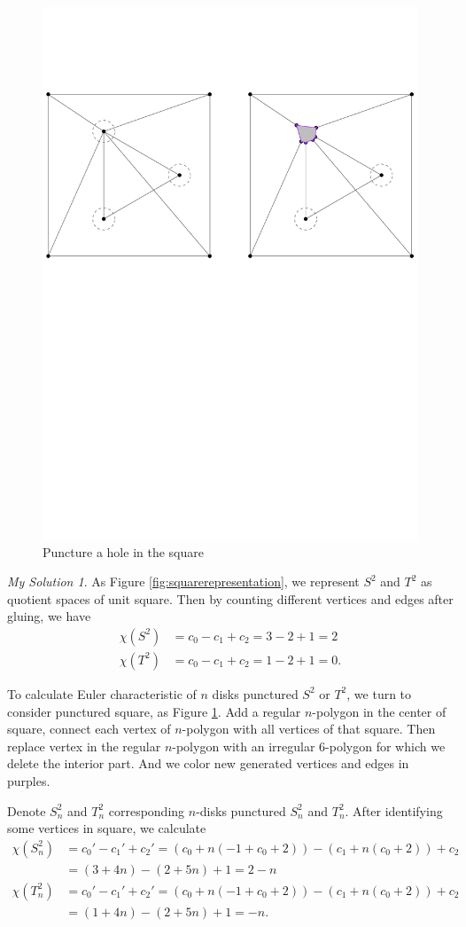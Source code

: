 \documentclass[]{article}
\theoremstyle{remark}
\newtheorem*{sol}{My Solution}
\begin{document}
\begin{figure}
	\centering
	\includegraphics[width=0.7\linewidth]{"delete hole"}
	\caption{Puncture a hole in the square}
	\label{fig:delete-hole}
\end{figure}
\begin{sol}
	As Figure \ref{fig:squarerepresentation}, we represent $ S^2 $ and $ T^2 $ as quotient spaces of unit square. Then by counting different vertices and edges after gluing, we have
	\begin{align*}
		\chi(S^2)&=c_0-c_1+c_2=3-2+1=2\\ \chi(T^2)&=c_0-c_1+c_2=1-2+1=0.
	\end{align*}
	
	To calculate Euler characteristic of $ n $ disks punctured $ S^2 $ or $ T^2 $, we turn to consider punctured square, as Figure \ref{fig:delete-hole}. Add a regular $ n $-polygon in the center of square, connect each vertex of $ n $-polygon with all vertices of that square. Then replace vertex in the regular $ n $-polygon with an irregular $ 6 $-polygon for which we delete the interior part. And we color new generated vertices and edges in purples.
	
	Denote $ S_n^2 $ and $ T_n^2 $ corresponding $ n $-disks punctured $ S_n^2 $ and $ T_n^2 $. After identifying some vertices in square, we calculate
		\begin{align*}
	\chi(S^2_n)&=c_0'-c_1'+c_2'=(c_0+n(-1 + c_0 +2))-(c_1 +n(c_0 +2))+c_2\\&=(3+4n)-(2+5n)+1=2-n\\ 	\chi(T^2_n)&=c_0'-c_1'+c_2'=(c_0+n(-1 + c_0 +2))-(c_1 +n(c_0 +2))+c_2\\&=(1+4n)-(2+5n)+1=-n.
	\end{align*}
	 
\end{sol}
\end{document}
